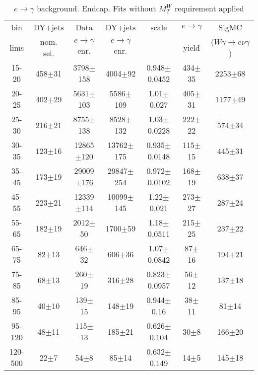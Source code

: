 \begin{table}[h]
  \scriptsize
  \begin{center}
  \caption{$e\rightarrow\gamma$ background. Endcap. Fits without $M_T^W$ requirement applied }  
  \begin{tabular}{|c|c|c|c|c|c|c|}
 bin  & DY+jets    & Data                      & DY+jets & scale & $e\rightarrow\gamma$ & SigMC\\ 
 lims & nom. sel. & $e\rightarrow\gamma$ enr. & $e\rightarrow\gamma$ enr. & & yield & ($W\gamma\rightarrow e\nu\gamma$)\\ \hline
15-20 & 458$\pm$31 & 3798$\pm$158 & 4004$\pm$92 & 0.948$\pm$0.0452& 434$\pm$35& 2253$\pm$68 \\ \hline
20-25 & 402$\pm$29 & 5631$\pm$103 & 5586$\pm$109 & 1.01$\pm$0.027& 405$\pm$31& 1177$\pm$49 \\ \hline
25-30 & 216$\pm$21 & 8755$\pm$138 & 8528$\pm$132 & 1.03$\pm$0.0228& 222$\pm$22& 574$\pm$34 \\ \hline
30-35 & 123$\pm$16 & 12865$\pm$120 & 13762$\pm$175 & 0.935$\pm$0.0148& 115$\pm$15& 445$\pm$31 \\ \hline
35-45 & 173$\pm$19 & 29009$\pm$176 & 29847$\pm$254 & 0.972$\pm$0.0102& 168$\pm$19& 638$\pm$37 \\ \hline
45-55 & 223$\pm$21 & 12339$\pm$114 & 10099$\pm$145 & 1.22$\pm$0.021& 273$\pm$27& 287$\pm$24 \\ \hline
55-65 & 182$\pm$19 & 2012$\pm$50 & 1700$\pm$59 & 1.18$\pm$0.0511& 215$\pm$25& 237$\pm$22 \\ \hline
65-75 & 82$\pm$13 & 646$\pm$32 & 606$\pm$36 & 1.07$\pm$0.0842& 87$\pm$16& 194$\pm$21 \\ \hline
75-85 & 68$\pm$13 & 260$\pm$19 & 316$\pm$28 & 0.823$\pm$0.0957& 56$\pm$12& 137$\pm$18 \\ \hline
85-95 & 40$\pm$10 & 139$\pm$15 & 148$\pm$19 & 0.944$\pm$0.16& 38$\pm$11& 81$\pm$14 \\ \hline
95-120 & 48$\pm$11 & 115$\pm$13 & 185$\pm$21 & 0.626$\pm$0.104& 30$\pm$8& 166$\pm$20 \\ \hline
120-500 & 22$\pm$7 & 54$\pm$8 & 85$\pm$14 & 0.632$\pm$0.149& 14$\pm$5& 145$\pm$18 \\ \hline
  \end{tabular}
  \label{tab:EtoGAMMA_NoWMtCut_1}
  \end{center}
\end{table}
